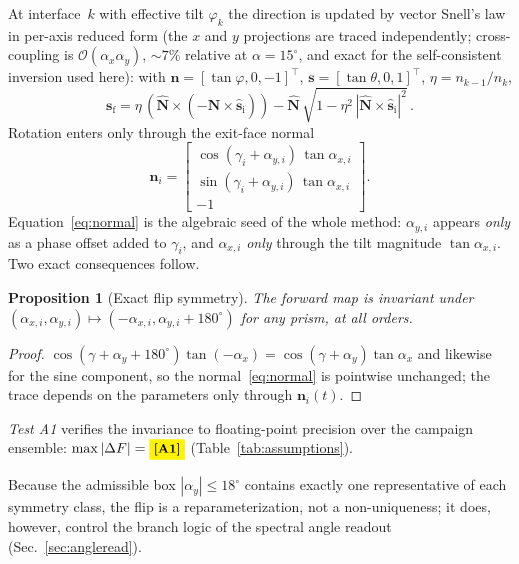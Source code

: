 \documentclass[twocolumn,preprintnumbers,amsmath,amssymb,pra,floatfix]{revtex4-2}
\newcommand{\vect}[1]{\bm{#1}}
\newcommand{\uvec}[1]{\hat{\bm{#1}}}
\newcommand{\bigO}{\mathcal{O}}
\newtheorem{proposition}{Proposition}
\newcommand{\PH}[1]{\colorbox{yellow}{\textbf{\small [#1]}}}
\begin{document}
At interface~$k$ with effective tilt $\varphi_k$ the direction is
updated by vector Snell's law in per-axis reduced form (the $x$ and $y$
projections are traced independently; cross-coupling is
$\bigO(\alpha_x\alpha_y)$, $\sim\!7\%$ relative at $\alpha=15^\circ$,
and exact for the self-consistent inversion used here): with
$\vect{n}=[\tan\varphi,0,-1]^{\top}$,
$\vect{s}=[\tan\theta,0,1]^{\top}$, $\eta=n_{k-1}/n_k$,
\begin{equation}
  \vect{s}_\mathrm{f} =
  \eta\,(\uvec{N}\times(-\uvec{N}\times\uvec{s}_\mathrm{i}))
    - \uvec{N}\,\sqrt{1-\eta^2\,|\uvec{N}\times\uvec{s}_\mathrm{i}|^2}\,.
  \label{eq:snell}
\end{equation}
Rotation enters only through the exit-face normal
\begin{equation}
  \vect{n}_i = \begin{bmatrix}
    \cos(\gamma_i+\alpha_{y,i})\,\tan\alpha_{x,i} \\
    \sin(\gamma_i+\alpha_{y,i})\,\tan\alpha_{x,i} \\
    -1
  \end{bmatrix}.
  \label{eq:normal}
\end{equation}
Equation~\eqref{eq:normal} is the algebraic seed of the whole method:
$\alpha_{y,i}$ appears \emph{only} as a phase offset added to
$\gamma_i$, and $\alpha_{x,i}$ \emph{only} through the tilt magnitude
$\tan\alpha_{x,i}$.  Two exact consequences follow.

\begin{proposition}[Exact flip symmetry]
\label{prop:flip}
The forward map is invariant under
$(\alpha_{x,i},\alpha_{y,i})\mapsto(-\alpha_{x,i},\alpha_{y,i}+180^\circ)$
for any prism, at all orders.
\end{proposition}
\begin{proof}
$\cos(\gamma+\alpha_y+180^\circ)\tan(-\alpha_x)
 =\cos(\gamma+\alpha_y)\tan\alpha_x$ and likewise for the sine
component, so the normal~\eqref{eq:normal} is pointwise unchanged; the
trace depends on the parameters only through $\vect{n}_i(t)$.
\end{proof}

\noindent\emph{Test A1} verifies the invariance to floating-point
precision over the campaign ensemble: $\max|\Delta F| = \PH{A1}$
(Table~\ref{tab:assumptions}).

Because the admissible box $|\alpha_y|\le18^\circ$ contains exactly one
representative of each symmetry class, the flip is a
reparameterization, not a non-uniqueness; it does, however, control the
branch logic of the spectral angle readout
(Sec.~\ref{sec:angleread}).
\end{document}
